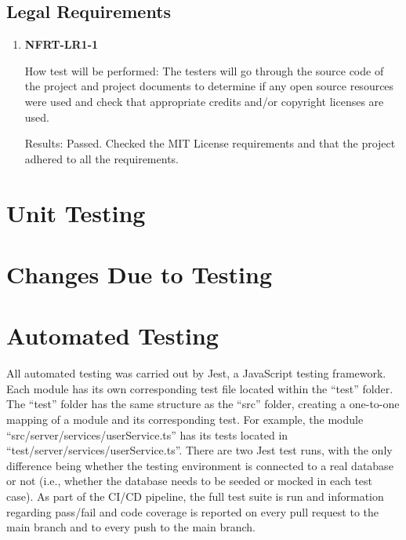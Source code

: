 \documentclass[12pt, titlepage]{article}
\begin{document}
\subsection{Legal Requirements}
\begin{enumerate}
	\item \textbf{NFRT-LR1-1}

	      How test will be performed: The testers will go through the source code of the project and project
	      documents to determine if any open source resources were used and check that appropriate credits
	      and/or copyright licenses are used.

	      Results: Passed. Checked the MIT License requirements and that the project adhered to all the
	      requirements.

\end{enumerate}

\section{Unit Testing}

\section{Changes Due to Testing}


\section{Automated Testing}

All automated testing was carried out by Jest, a JavaScript testing framework. Each module has its
own corresponding test file located within the ``test'' folder. The ``test'' folder has the same
structure as the ``src'' folder, creating a one-to-one mapping of a module and its corresponding
test. For example, the module ``src/server/services/userService.ts'' has its tests located in
``test/server/services/userService.ts''. There are two Jest test runs, with the only difference
being whether the testing environment is connected to a real database or not (i.e., whether the
database needs to be seeded or mocked in each test case). As part of the CI/CD pipeline, the full
test suite is run and information regarding pass/fail and code coverage is reported on every pull
request to the main branch and to every push to the main branch.
\end{document}
